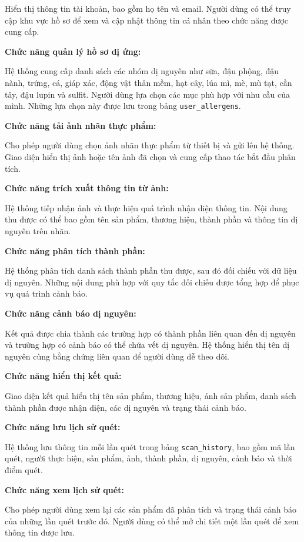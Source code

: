 Hiển thị thông tin tài khoản, bao gồm họ tên và email. Người dùng có thể truy cập khu vực hồ sơ để xem và cập nhật thông tin cá nhân theo chức năng được cung cấp.

\textbf{Chức năng quản lý hồ sơ dị ứng:}

Hệ thống cung cấp danh sách các nhóm dị nguyên như sữa, đậu phộng, đậu nành, trứng, cá, giáp xác, động vật thân mềm, hạt cây, lúa mì, mè, mù tạt, cần tây, đậu lupin và sulfit. Người dùng lựa chọn các mục phù hợp với nhu cầu của mình. Những lựa chọn này được lưu trong bảng \texttt{user\_allergens}.

\textbf{Chức năng tải ảnh nhãn thực phẩm:}

Cho phép người dùng chọn ảnh nhãn thực phẩm từ thiết bị và gửi lên hệ thống. Giao diện hiển thị ảnh hoặc tên ảnh đã chọn và cung cấp thao tác bắt đầu phân tích.

\textbf{Chức năng trích xuất thông tin từ ảnh:}

Hệ thống tiếp nhận ảnh và thực hiện quá trình nhận diện thông tin. Nội dung thu được có thể bao gồm tên sản phẩm, thương hiệu, thành phần và thông tin dị nguyên trên nhãn.

\textbf{Chức năng phân tích thành phần:}

Hệ thống phân tích danh sách thành phần thu được, sau đó đối chiếu với dữ liệu dị nguyên. Những nội dung phù hợp với quy tắc đối chiếu được tổng hợp để phục vụ quá trình cảnh báo.

\textbf{Chức năng cảnh báo dị nguyên:}

Kết quả được chia thành các trường hợp có thành phần liên quan đến dị nguyên và trường hợp có cảnh báo có thể chứa vết dị nguyên. Hệ thống hiển thị tên dị nguyên cùng bằng chứng liên quan để người dùng dễ theo dõi.

\textbf{Chức năng hiển thị kết quả:}

Giao diện kết quả hiển thị tên sản phẩm, thương hiệu, ảnh sản phẩm, danh sách thành phần được nhận diện, các dị nguyên và trạng thái cảnh báo.

\textbf{Chức năng lưu lịch sử quét:}

Hệ thống lưu thông tin mỗi lần quét trong bảng \texttt{scan\_history}, bao gồm mã lần quét, người thực hiện, sản phẩm, ảnh, thành phần, dị nguyên, cảnh báo và thời điểm quét.

\textbf{Chức năng xem lịch sử quét:}

Cho phép người dùng xem lại các sản phẩm đã phân tích và trạng thái cảnh báo của những lần quét trước đó. Người dùng có thể mở chi tiết một lần quét để xem thông tin được lưu.

